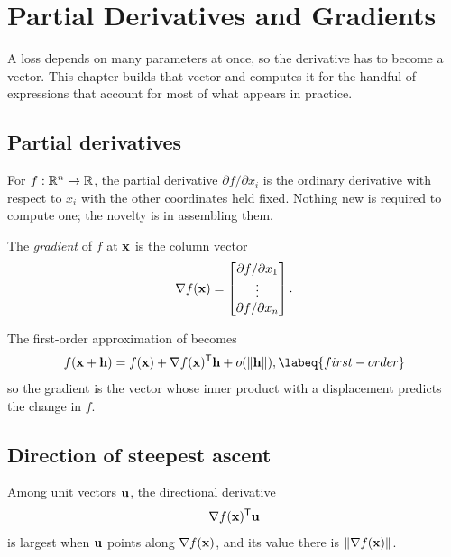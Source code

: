 \setchapterpreamble[u]{\margintoc}
\chapter{Partial Derivatives and Gradients}


A loss depends on many parameters at once, so the derivative has to become a
vector. This chapter builds that vector and computes it for the handful of
expressions that account for most of what appears in practice.

\section{Partial derivatives}

For \(f:\mathbb{R}^{n}\to\mathbb{R}\), the partial derivative \(\partial f/\partial x_i\) is the
ordinary derivative with respect to \(x_i\) with the other coordinates held
fixed. Nothing new is required to compute one; the novelty is in assembling
them.

\begin{definition}
The \emph{gradient} of \(f\) at \(\mathbf{x}\) is the column vector
\[
	\nabla f(\mathbf{x})
	=\begin{bmatrix}
		\partial f/\partial x_1\\ \vdots\\ \partial f/\partial x_n
	\end{bmatrix}.
\]
\end{definition}

The first-order approximation of  becomes
\begin{equation}
	f(\vect{x}+\vect{h})=f(\vect{x})+\nabla f(\vect{x})\tp\vect{h}+o(\lVert\vect{h}\rVert),
	\labeq{first-order}
\end{equation}
so the gradient is the vector whose inner product with a displacement predicts
the change in \(f\).

\section{Direction of steepest ascent}

\begin{proposition}
Among unit vectors \(\mathbf{u}\), the directional derivative
\[
	\nabla f(\mathbf{x})^{\mathsf{T}}\mathbf{u}
\]
is largest when \(\mathbf{u}\) points along \(\nabla f(\mathbf{x})\), and its value
there is \(\lVert\nabla f(\mathbf{x})\rVert\).
\end{proposition}

